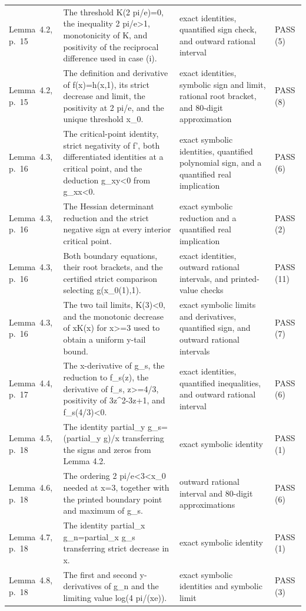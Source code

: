 {\begin{longtable}{@{}>{\raggedright\arraybackslash}p{30mm}>{\raggedright\arraybackslash}p{64mm}>{\raggedright\arraybackslash}p{44mm}>{\raggedright\arraybackslash}p{16mm}@{}}
Lemma~4.2, p.~15 & The threshold K(2 pi/e)=0, the inequality 2 pi/e>1, monotonicity of K, and positivity of the reciprocal difference used in case (i). & exact identities, quantified sign check, and outward rational interval & PASS (5) \\
Lemma~4.2, p.~15 & The definition and derivative of f(x)=h(x,1), its strict decrease and limit, the positivity at 2 pi/e, and the unique threshold x\_0. & exact identities, symbolic sign and limit, rational root bracket, and 80-digit approximation & PASS (8) \\
Lemma~4.3, p.~16 & The critical-point identity, strict negativity of f', both differentiated identities at a critical point, and the deduction g\_xy<0 from g\_xx<0. & exact symbolic identities, quantified polynomial sign, and a quantified real implication & PASS (6) \\
Lemma~4.3, p.~16 & The Hessian determinant reduction and the strict negative sign at every interior critical point. & exact symbolic reduction and a quantified real implication & PASS (2) \\
Lemma~4.3, p.~16 & Both boundary equations, their root brackets, and the certified strict comparison selecting g(x\_0(1),1). & exact identities, outward rational intervals, and printed-value checks & PASS (11) \\
Lemma~4.3, p.~16 & The two tail limits, K(3)<0, and the monotonic decrease of xK(x) for x>=3 used to obtain a uniform y-tail bound. & exact symbolic limits and derivatives, quantified sign, and outward rational intervals & PASS (7) \\
Lemma~4.4, p.~17 & The x-derivative of g\_s, the reduction to f\_s(z), the derivative of f\_s, z>=4/3, positivity of 3z\textasciicircum{}2-3z+1, and f\_s(4/3)<0. & exact identities, quantified inequalities, and outward rational interval & PASS (6) \\
Lemma~4.5, p.~18 & The identity partial\_y g\_s=(partial\_y g)/x transferring the signs and zeros from Lemma 4.2. & exact symbolic identity & PASS (1) \\
Lemma~4.6, p.~18 & The ordering 2 pi/e<3<x\_0 needed at x=3, together with the printed boundary point and maximum of g\_s. & outward rational interval and 80-digit approximations & PASS (6) \\
Lemma~4.7, p.~18 & The identity partial\_x g\_n=partial\_x g\_s transferring strict decrease in x. & exact symbolic identity & PASS (1) \\
Lemma~4.8, p.~18 & The first and second y-derivatives of g\_n and the limiting value log(4 pi/(xe)). & exact symbolic identities and symbolic limit & PASS (3) \\

\end{longtable}}
